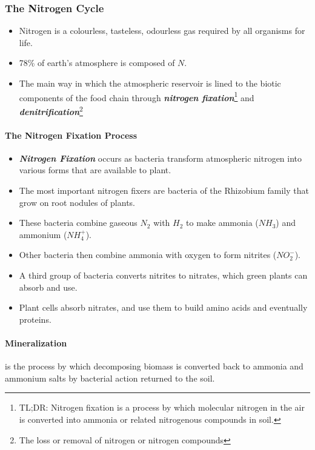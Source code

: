 \documentclass[10pt]{article}
\begin{document}
\subsubsection{The Nitrogen Cycle}
\begin{itemize}
    \item Nitrogen is a colourless, tasteless, odourless gas required by all organisms for life. 
    \item 78\% of earth's atmosphere is composed of $N$. 
    \item \color{Red}The main way in which the atmospheric reservoir is lined to the biotic components of the food chain through \textit{\textbf{nitrogen fixation}}\footnote{TL;DR: Nitrogen fixation is a process by which molecular nitrogen in the air is converted into ammonia or related nitrogenous compounds in soil.} and \textit{\textbf{denitrification}}\footnote{The loss or removal of nitrogen or nitrogen compounds}\color{Black}
\end{itemize}
\paragraph{The Nitrogen Fixation Process}
\begin{itemize}
    \item \textit{\textbf{Nitrogen Fixation}} occurs as bacteria transform atmospheric nitrogen into various forms that are available to plant.
    \item The most important nitrogen fixers are bacteria of the Rhizobium family that grow on root nodules of plants.
    \item These bacteria combine gaseous $N_2$ with $H_2$ to make ammonia ($NH_3$) and ammonium ($NH_4^+$).
    \item Other bacteria then combine ammonia with oxygen to form nitrites ($NO_2^-$). 
    \item A third group of bacteria converts nitrites to nitrates, which green plants can absorb and use. 
    \item Plant cells absorb nitrates, and use them to build amino acids and eventually proteins. 
\end{itemize}


\paragraph{Mineralization} is the process by which decomposing biomass is converted back to ammonia and ammonium salts by bacterial action returned to the soil. 
\end{document}
